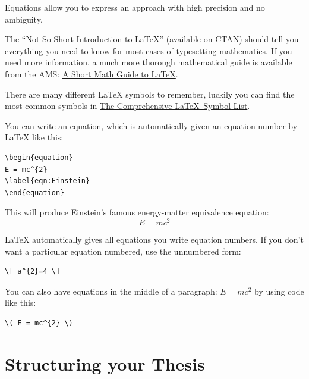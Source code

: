 Equations allow you to express an approach with high precision and no ambiguity. 

The \enquote{Not So Short Introduction to LaTeX} (available on \href{http://www.ctan.org/tex-archive/info/lshort/english/lshort.pdf}{CTAN}) should tell you everything you need to know for most cases of typesetting mathematics. If you need more information, a much more thorough mathematical guide is available from the AMS: \href{{ftp://ftp.ams.org/pub/tex/doc/amsmath/short-math-guide.pdf}}{A Short Math Guide to LaTeX}.

There are many different LaTeX symbols to remember, luckily you can find the most common symbols in \href{http://ctan.org/pkg/comprehensive}{The Comprehensive \LaTeX~Symbol List}.

You can write an equation, which is automatically given an equation number by LaTeX like this:
\begin{lstlisting}[language={[LaTeX]TeX}]
\begin{equation}
E = mc^{2}
\label{eqn:Einstein}
\end{equation}
\end{lstlisting}

This will produce Einstein's famous energy-matter equivalence equation:
\begin{equation}
E = mc^{2}
\label{eqn:Einstein}
\end{equation}

LaTeX automatically gives all equations you write equation numbers. If you don't want a particular equation numbered, use the unnumbered form:

\begin{lstlisting}[language={[LaTeX]TeX}]
\[ a^{2}=4 \]
\end{lstlisting}

You can also have equations in the middle of a paragraph: \( E = mc^{2} \) by using code like this: 

\begin{lstlisting}[language={[LaTeX]TeX}]
\( E = mc^{2} \)
\end{lstlisting}


\section{Structuring your Thesis}

